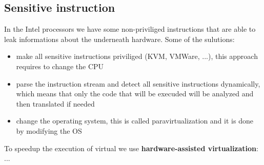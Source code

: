 \documentclass[12pt]{article}
\begin{document}
\subsection{Sensitive instruction}
In the Intel processors we have some non-priviliged instructions that are able to leak informations about the underneath hardware. Some of the sulutions:
\begin{itemize}
  \item make all sensitive instructions priviliged (KVM, VMWare, ...), this approach requires to change the CPU
  \item parse the instruction stream and detect all sensitive instructions dynamically, which means that only the code that will be execuded will be analyzed and then translated if needed
  \item change the operating system, this is called paravirtualization and it is done by modifying the OS
\end{itemize}
To speedup the execution of virtual we use \textbf{hardware-assisted virtualization}:
...
\end{document}
